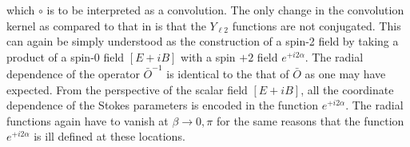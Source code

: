 %
which $\circ$ is to be interpreted as a convolution. The only change in the convolution kernel as compared to that in  is that the $Y_{\ell 2}$ functions are not conjugated. This can again be simply understood as the construction of a spin-2 field by taking a product of a spin-0 field $[E +iB]$ with a spin $+2$ field $e^{+i2\alpha}$. The radial dependence of the operator ${\bar O}^{-1}$  is identical to the that of ${\bar O}$ as one may have expected. From the perspective of the scalar field $[E + iB]$, all the coordinate dependence of the Stokes parameters is encoded in the function $e^{+i2\alpha}$.  The radial functions again have to vanish at $\beta \rightarrow 0,\pi$ for the same reasons that the function $e^{+i2\alpha}$ is ill defined at these locations.
